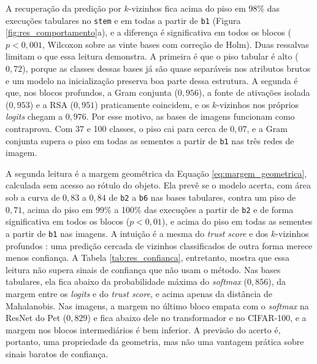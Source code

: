 A recuperação da predição por $k$-vizinhos fica acima do piso em 98\% das execuções tabulares no \texttt{stem} e em todas a partir de \texttt{b1} (Figura \ref{fig:res_comportamento}a), e a diferença é significativa em todos os blocos ($p < 0{,}001$, Wilcoxon sobre as vinte bases com correção de Holm). Duas ressalvas limitam o que essa leitura demonstra. A primeira é que o piso tabular é alto ($0{,}72$), porque as classes dessas bases já são quase separáveis nos atributos brutos e um modelo na inicialização preserva boa parte dessa estrutura. A segunda é que, nos blocos profundos, a Gram conjunta ($0{,}956$), a fonte de ativações isolada ($0{,}953$) e a RSA ($0{,}951$) praticamente coincidem, e os $k$-vizinhos nos próprios \textit{logits} chegam a $0{,}976$. Por esse motivo, as bases de imagens funcionam como contraprova. Com 37 e 100 classes, o piso cai para cerca de $0{,}07$, e a Gram conjunta supera o piso em todas as sementes a partir de \texttt{b1} nas três redes de imagem.

A segunda leitura é a margem geométrica da Equação \eqref{eq:margem_geometrica}, calculada sem acesso ao rótulo do objeto. Ela prevê se o modelo acerta, com área sob a curva de $0{,}83$ a $0{,}84$ de \texttt{b2} a \texttt{b6} nas bases tabulares, contra um piso de $0{,}71$, acima do piso em 99\% a 100\% das execuções a partir de \texttt{b2} e de forma significativa em todos os blocos ($p < 0{,}01$), e acima do piso em todas as sementes a partir de \texttt{b1} nas imagens. A intuição é a mesma do \textit{trust score} \citep{Jiang2018} e dos $k$-vizinhos profundos \citep{Papernot2018}: uma predição cercada de vizinhos classificados de outra forma merece menos confiança. A Tabela \ref{tab:res_confianca}, entretanto, mostra que essa leitura não supera sinais de confiança que não usam o método. Nas bases tabulares, ela fica abaixo da probabilidade máxima do \textit{softmax} ($0{,}856$), da margem entre os \textit{logits} e do \textit{trust score}, e acima apenas da distância de Mahalanobis. Nas imagens, a margem no último bloco empata com o \textit{softmax} na ResNet do Pet ($0{,}829$) e fica abaixo dele no transformador e no CIFAR-100, e a margem nos blocos intermediários é bem inferior. A previsão do acerto é, portanto, uma propriedade da geometria, mas não uma vantagem prática sobre sinais baratos de confiança.

